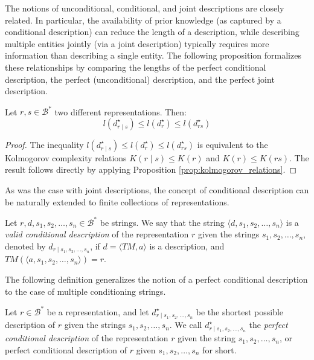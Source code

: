 The notions of unconditional, conditional, and joint descriptions are closely related. In particular, the availability of prior knowledge (as captured by a conditional description) can reduce the length of a description, while describing multiple entities jointly (via a joint description) typically requires more information than describing a single entity. The following proposition formalizes these relationships by comparing the lengths of the perfect conditional description, the perfect (unconditional) description, and the perfect joint description.

\begin{proposition}
\label{prop:description_conditional_joint}
Let $r, s \in \mathcal{B}^\ast$ two different representations. Then:
\[
l \left( d^\star_{r \mid s} \right) \leq l \left( d^\star_r \right) \leq l \left( d^\star_{rs} \right)
\]
\end{proposition}
\begin{proof}
The inequality $l \left( d^\star_{r \mid s} \right) \leq l \left( d^\star_r \right) \leq l \left( d^\star_{rs} \right)$ is equivalent to the Kolmogorov complexity relations $K(r \mid s) \leq K(r)$ and $K(r) \leq K(rs)$. The result follows directly by applying Proposition \ref{prop:kolmogorov_relations}.
\end{proof}

As was the case with joint descriptions, the concept of conditional description can be naturally extended to finite collections of representations.

\begin{definition}
Let $r, d, s_1, s_2, \ldots, s_n \in \mathcal{B}^\ast$ be strings. We say that the string $\langle d, s_1, s_2, \ldots, s_n \rangle$ is a \emph{valid conditional description} of the representation $r$ given the strings $s_1, s_2, \ldots, s_n$, denoted by $d_{r \mid s_1, s_2, \ldots, s_n}$, if $d = \langle TM, a \rangle$ is a description, and $TM \left(\langle a, s_1, s_2, \ldots, s_n \rangle \right) = r$.
\end{definition}

The following definition generalizes the notion of a perfect conditional description to the case of multiple conditioning strings.

\begin{definition}
Let $r \in \mathcal{B}^\ast$ be a representation, and let $d^\star_{r \mid s_1, s_2, \ldots, s_n}$ be the shortest possible description of $r$ given the strings $s_1, s_2, \ldots, s_n$. We call $d^\star_{r \mid s_1, s_2, \ldots, s_n}$ the \emph{perfect conditional description} of the representation $r$ given the string $s_1, s_2, \ldots, s_n$, or perfect conditional description of $r$ given $s_1, s_2, \ldots, s_n$ for short.
\end{definition}

